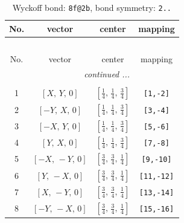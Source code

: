 \documentclass[fleqn,8pt]{jsarticle}
\begin{document}
\begin{longtable}{cccc}
\caption{Wyckoff bond: {\tt 8f@2b}, bond symmetry: {\tt 2..}}
 \\
 \hline \hline
No. & vector & center & mapping \\ \hline \endfirsthead

\multicolumn{3}{l}{\tablename\ \thetable{}} \\
 \hline \hline
No. & vector & center & mapping \\ \hline \endhead

 \hline \hline
\multicolumn{3}{r}{\footnotesize\it continued ...} \\ \endfoot

 \hline \hline
\multicolumn{3}{r}{} \\ \endlastfoot

1 & $\left[ X,\, Y,\, 0 \right]$ & $\left[ \frac{1}{4},\, \frac{1}{4},\, \frac{3}{4} \right]$ & {\tt [1,-2]} \\ \hline
2 & $\left[ - Y,\, X,\, 0 \right]$ & $\left[ \frac{1}{4},\, \frac{1}{4},\, \frac{3}{4} \right]$ & {\tt [3,-4]} \\ \hline
3 & $\left[ - X,\, Y,\, 0 \right]$ & $\left[ \frac{1}{4},\, \frac{1}{4},\, \frac{3}{4} \right]$ & {\tt [5,-6]} \\ \hline
4 & $\left[ Y,\, X,\, 0 \right]$ & $\left[ \frac{1}{4},\, \frac{1}{4},\, \frac{3}{4} \right]$ & {\tt [7,-8]} \\ \hline
5 & $\left[ - X,\, - Y,\, 0 \right]$ & $\left[ \frac{3}{4},\, \frac{3}{4},\, \frac{1}{4} \right]$ & {\tt [9,-10]} \\ \hline
6 & $\left[ Y,\, - X,\, 0 \right]$ & $\left[ \frac{3}{4},\, \frac{3}{4},\, \frac{1}{4} \right]$ & {\tt [11,-12]} \\ \hline
7 & $\left[ X,\, - Y,\, 0 \right]$ & $\left[ \frac{3}{4},\, \frac{3}{4},\, \frac{1}{4} \right]$ & {\tt [13,-14]} \\ \hline
8 & $\left[ - Y,\, - X,\, 0 \right]$ & $\left[ \frac{3}{4},\, \frac{3}{4},\, \frac{1}{4} \right]$ & {\tt [15,-16]} \\
\end{longtable}
\renewcommand{\arraystretch}{1.2}
\end{document}

